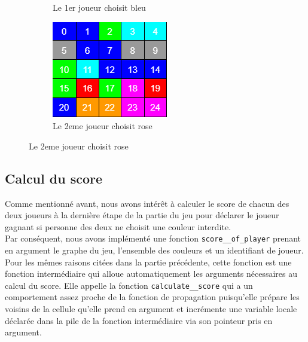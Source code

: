 \documentclass[11pt]{article}
\begin{document}
\begin{figure}[htp]
\begin{subfigure}{0.3\columnwidth}
\caption{Le 1er joueur choisit bleu}
\label{fig:time2}
\end{subfigure}\hfill
\begin{subfigure}{0.3\columnwidth}
\centering
\includegraphics[width=\textwidth]{img/iteration3.PNG}
\caption{Le 2eme joueur choisit rose}
\label{fig:time3}
\end{subfigure}
\end{figure}
\newpage
\subsection{Calcul du score}
Comme mentionné avant, nous avons intérêt à calculer le score de chacun des deux joueurs à la dernière étape de la partie du jeu pour déclarer le joueur gagnant si personne des deux ne choisit une couleur interdite.\\


Par conséquent, nous avons implémenté une fonction \texttt{score\_\_of\_player} prenant en argument le graphe du jeu, l'ensemble des couleurs et un identifiant de joueur. Pour les mêmes raisons citées dans la partie précédente, cette fonction est une fonction intermédiaire qui alloue automatiquement les arguments nécessaires au calcul du score. Elle appelle la fonction \texttt{calculate\_\_score} qui a un comportement assez proche de la fonction de propagation puisqu'elle prépare les voisins de la cellule qu'elle prend en argument et incrémente une variable locale déclarée dans la pile de la fonction intermédiaire via son pointeur pris en argument.\\
\end{document}
